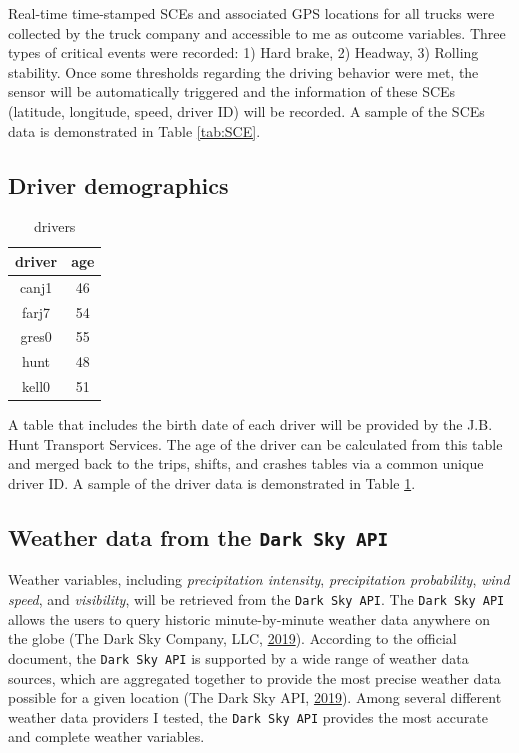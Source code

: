 \documentclass[12pt]{book}
\numberwithin{equation}{chapter}
\begin{document}
Real-time time-stamped SCEs and associated GPS locations for all trucks were collected by the truck company and accessible to me as outcome variables. Three types of critical events were recorded: 1) Hard brake, 2) Headway, 3) Rolling stability. Once some thresholds regarding the driving behavior were met, the sensor will be automatically triggered and the information of these SCEs (latitude, longitude, speed, driver ID) will be recorded. A sample of the SCEs data is demonstrated in Table \ref{tab:SCE}.

\hypertarget{driver-demographics}{%
\subsection{Driver demographics}\label{driver-demographics}}

\begin{table}
\caption{\label{tab:drivers}drivers}
\centering
\begin{tabular}{cc}
\toprule
driver & age\\
\midrule
canj1 & 46\\
farj7 & 54\\
gres0 & 55\\
hunt & 48\\
kell0 & 51\\
\bottomrule
\end{tabular}
\end{table}

A table that includes the birth date of each driver will be provided by the J.B. Hunt Transport Services. The age of the driver can be calculated from this table and merged back to the trips, shifts, and crashes tables via a common unique driver ID. A sample of the driver data is demonstrated in Table \ref{tab:drivers}.

\hypertarget{weather-data-from-the-dark-sky-api}{%
\subsection{\texorpdfstring{Weather data from the \texttt{Dark\ Sky\ API}}{Weather data from the Dark Sky API}}\label{weather-data-from-the-dark-sky-api}}

Weather variables, including \emph{precipitation intensity}, \emph{precipitation probability}, \emph{wind speed}, and \emph{visibility}, will be retrieved from the \texttt{Dark\ Sky\ API}.
The \texttt{Dark\ Sky\ API} allows the users to query historic minute-by-minute weather data anywhere on the globe (The Dark Sky Company, LLC, \protect\hyperlink{ref-darksky}{2019}).
According to the official document, the \texttt{Dark\ Sky\ API} is supported by a wide range of weather data sources, which are aggregated together to provide the most precise weather data possible for a given location (The Dark Sky API, \protect\hyperlink{ref-darkskyds}{2019}).
Among several different weather data providers I tested, the \texttt{Dark\ Sky\ API} provides the most accurate and complete weather variables.
\end{document}
